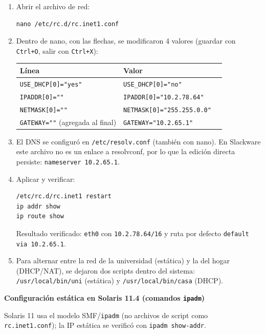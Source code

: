 \documentclass[11pt,a4paper]{report}
\begin{document}
\begin{enumerate}
  \item Abrir el archivo de red:
  \begin{verbatim}
nano /etc/rc.d/rc.inet1.conf
  \end{verbatim}
  \item Dentro de nano, con las flechas, se modificaron 4 valores (guardar con \texttt{Ctrl+O}, salir con \texttt{Ctrl+X}):
  \begin{center}
  \begin{tabular}{lll}
    \toprule
    \textbf{Línea} & \textbf{Valor} \\
    \midrule
    \texttt{USE\_DHCP[0]="yes"} & \texttt{USE\_DHCP[0]="no"} \\
    \texttt{IPADDR[0]=""} & \texttt{IPADDR[0]="10.2.78.64"} \\
    \texttt{NETMASK[0]=""} & \texttt{NETMASK[0]="255.255.0.0"} \\
    \texttt{GATEWAY=""} (agregada al final) & \texttt{GATEWAY="10.2.65.1"} \\
    \bottomrule
  \end{tabular}
  \end{center}
  \item El DNS se configuró en \texttt{/etc/resolv.conf} (también con nano). En Slackware este archivo no es un enlace a resolvconf, por lo que la edición directa persiste: \texttt{nameserver 10.2.65.1}.
  \item Aplicar y verificar:
  \begin{verbatim}
/etc/rc.d/rc.inet1 restart
ip addr show
ip route show
  \end{verbatim}
  Resultado verificado: \texttt{eth0} con \texttt{10.2.78.64/16} y ruta por defecto \texttt{default via 10.2.65.1}.
  \item Para alternar entre la red de la universidad (estática) y la del hogar (DHCP/NAT), se dejaron dos scripts dentro del sistema: \texttt{/usr/local/bin/uni} (estática) y \texttt{/usr/local/bin/casa} (DHCP).
\end{enumerate}

\textbf{Configuración estática en Solaris 11.4 (comandos \texttt{ipadm})}

Solaris 11 usa el modelo SMF/\texttt{ipadm} (no archivos de script como \texttt{rc.inet1.conf}); la IP estática se verificó con \texttt{ipadm show-addr}.
\end{document}
